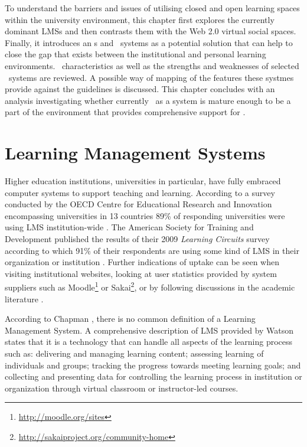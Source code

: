 To understand the barriers and issues of utilising closed and open learning
spaces within the university environment, this chapter first explores the
currently dominant LMSs and then contrasts them with the Web 2.0 virtual social
spaces. Finally, it introduces an \ep s and \ep~systems as a potential solution
that can help to close the gap that exists between the institutional and
personal learning environments. \ep~characteristics as well as the strengths and
weaknesses of selected \ep~systems are reviewed. A possible way of mapping of
the features these systmes provide against the \LLLs guidelines is discussed.
This chapter concludes with an analysis investigating whether currently \ep~as a
system is mature enough to be a part of the environment that provides
comprehensive support for \LLLsn.

\section{Learning Management Systems}
Higher education institutions, universities in particular, have fully embraced
computer systems to support teaching and learning. According to a survey
conducted by the OECD Centre for Educational Research and Innovation
encompassing universities in 13 countries 89\% of responding universities were
using LMS institution-wide \citep{OECD2005}. The American Society for Training
and Development published the results of their 2009 \textit{Learning Circuits}
survey according to which 91\% of their respondents are using some kind of LMS
in their organization or institution \citep{Ellis2009}. Further indications of
uptake can be seen when visiting institutional websites, looking at user
statistics provided by system suppliers such as
Moodle\footnote{\url{http://moodle.org/sites}} or
Sakai\footnote{\url{http://sakaiproject.org/community-home}}, or by following
discussions in the academic literature \citep{Browne2006,Collis2004}.

According to Chapman \citeyearpar{Chapman2009}, there is no common definition of
a Learning Management System. A comprehensive description of LMS provided by
Watson \citeyearpar{Watson2007} states that it is a technology that can handle
all aspects of the learning process such as: delivering and managing learning
content; assessing learning of individuals and groups; tracking the progress
towards meeting learning goals; and collecting and presenting data for
controlling the learning process in institution or organization through virtual
classroom or instructor-led courses.

